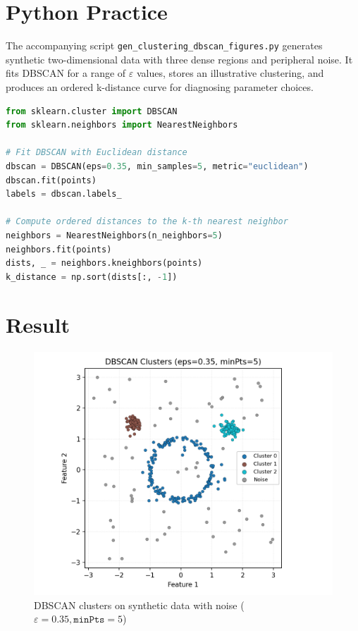 ﻿\documentclass[12pt]{article}
\begin{document}
\section{Python Practice}
The accompanying script \texttt{gen\_clustering\_dbscan\_figures.py} generates synthetic two-dimensional data with three dense regions and peripheral noise. It fits DBSCAN for a range of \(\varepsilon\) values, stores an illustrative clustering, and produces an ordered k-distance curve for diagnosing parameter choices.
\begin{lstlisting}[language=Python,caption={Excerpt from gen_clustering_dbscan_figures.py}]
from sklearn.cluster import DBSCAN
from sklearn.neighbors import NearestNeighbors

# Fit DBSCAN with Euclidean distance
dbscan = DBSCAN(eps=0.35, min_samples=5, metric="euclidean")
dbscan.fit(points)
labels = dbscan.labels_

# Compute ordered distances to the k-th nearest neighbor
neighbors = NearestNeighbors(n_neighbors=5)
neighbors.fit(points)
dists, _ = neighbors.kneighbors(points)
k_distance = np.sort(dists[:, -1])
\end{lstlisting}

\section{Result}
\begin{figure}[H]
  \centering
  \includegraphics[width=0.8\linewidth]{dbscan_clusters.png}
  \caption{DBSCAN clusters on synthetic data with noise (\(\varepsilon=0.35, \texttt{minPts}=5\))}
  \label{fig:dbscan_clusters}
\end{figure}
\end{document}
